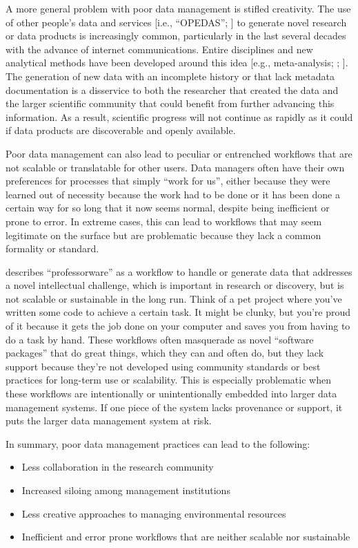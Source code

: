 \documentclass[
]{book}
\providecommand{\tightlist}{%
  \setlength{\itemsep}{0pt}\setlength{\parskip}{0pt}}
\begin{document}
A more general problem with poor data management is stifled creativity. The use of other people's data and services {[}i.e., ``OPEDAS''; \citet{Mons18}{]} to generate novel research or data products is increasingly common, particularly in the last several decades with the advance of internet communications. Entire disciplines and new analytical methods have been developed around this idea {[}e.g., meta-analysis; \citet{Carpenter09}; \citet{Lortie14}{]}. The generation of new data with an incomplete history or that lack metadata documentation is a disservice to both the researcher that created the data and the larger scientific community that could benefit from further advancing this information. As a result, scientific progress will not continue as rapidly as it could if data products are discoverable and openly available.

Poor data management can also lead to peculiar or entrenched workflows that are not scalable or translatable for other users. Data managers often have their own preferences for processes that simply ``work for us'', either because they were learned out of necessity because the work had to be done or it has been done a certain way for so long that it now seems normal, despite being inefficient or prone to error. In extreme cases, this can lead to workflows that may seem legitimate on the surface but are problematic because they lack a common formality or standard.

\citet{Mons18} describes ``professorware'' as a workflow to handle or generate data that addresses a novel intellectual challenge, which is important in research or discovery, but is not scalable or sustainable in the long run. Think of a pet project where you've written some code to achieve a certain task. It might be clunky, but you're proud of it because it gets the job done on your computer and saves you from having to do a task by hand. These workflows often masquerade as novel ``software packages'' that do great things, which they can and often do, but they lack support because they're not developed using community standards or best practices for long-term use or scalability. This is especially problematic when these workflows are intentionally or unintentionally embedded into larger data management systems. If one piece of the system lacks provenance or support, it puts the larger data management system at risk.

In summary, poor data management practices can lead to the following:

\begin{itemize}
\tightlist
\item
  Less collaboration in the research community
\item
  Increased siloing among management institutions
\item
  Less creative approaches to managing environmental resources
\item
  Inefficient and error prone workflows that are neither scalable nor sustainable
\end{itemize}
\end{document}
